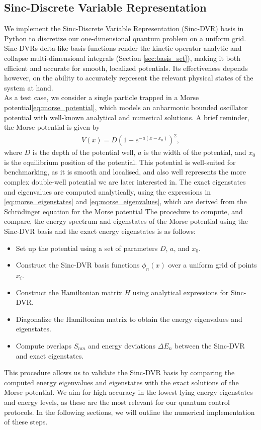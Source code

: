 \documentclass{subfiles}
\begin{document}
\subsection{Sinc-Discrete Variable Representation}\label{sec:sinc_dvr_validation}
We implement the Sinc-Discrete Variable Representation (Sinc-DVR) basis in Python to discretize our one-dimensional quantum problem on a uniform grid. Sinc-DVRs delta-like basis functions render the kinetic operator analytic and collapse multi-dimensional integrals (Section \ref{sec:basis_set}), making it both efficient and accurate for smooth, localized potentials. Its effectiveness depends however, on the ability to accurately represent the relevant physical states of the system at hand.  \\

As a test case, we consider a single particle trapped in a Morse potential\eqref{eq:morse_potential}, which models an anharmonic bounded oscillator potential with well-known analytical and numerical solutions. A brief reminder, the Morse potential is given by
\begin{align*}
    V(x) = D \left(1 - e^{-a(x - x_0)}\right)^2,
\end{align*}
where $D$ is the depth of the potential well, $a$ is the width of the potential, and $x_0$ is the equilibrium position of the potential. This potential is well-suited for benchmarking, as it is smooth and localised, and also well represents the more complex double-well potential we are later interested in. The exact eigenstates and eigenvalues are computed analytically, using the expressions in \eqref{eq:morse_eigenstates} and \eqref{eq:morse_eigenvalues}, which are derived from the Schrödinger equation for the Morse potential
The procedure to compute, and compare, the energy spectrum and eigenstates of the Morse potential using the Sinc-DVR basis and the exact energy eigenstates is as follows:
\begin{itemize}
    \item Set up the potential using a set of parameters $D$, $a$, and $x_0$.
    \item Construct the Sinc-DVR basis functions $\phi_n(x)$ over a uniform grid of points $x_i$.
    \item Construct the Hamiltonian matrix $H$ using analytical expressions for Sinc-DVR.
    \item Diagonalize the Hamiltonian matrix to obtain the energy eigenvalues and eigenstates.
    \item Compute overlaps $S_{nm}$ and energy deviations $\Delta E_n$ between the Sinc-DVR and exact eigenstates.
\end{itemize}
This procedure allows us to validate the Sinc-DVR basis by comparing the computed energy eigenvalues and eigenstates with the exact solutions of the Morse potential. We aim for high accuracy in the lowest lying energy eigenstates and energy levels, as these are the most relevant for our quantum control protocols. In the following sections, we will outline the numerical implementation of these steps.
\end{document}
